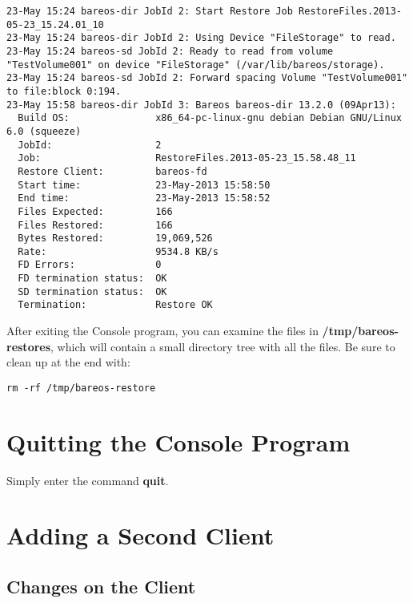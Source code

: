 \footnotesize
\begin{verbatim}
23-May 15:24 bareos-dir JobId 2: Start Restore Job RestoreFiles.2013-05-23_15.24.01_10
23-May 15:24 bareos-dir JobId 2: Using Device "FileStorage" to read.
23-May 15:24 bareos-sd JobId 2: Ready to read from volume "TestVolume001" on device "FileStorage" (/var/lib/bareos/storage).
23-May 15:24 bareos-sd JobId 2: Forward spacing Volume "TestVolume001" to file:block 0:194.
23-May 15:58 bareos-dir JobId 3: Bareos bareos-dir 13.2.0 (09Apr13):
  Build OS:               x86_64-pc-linux-gnu debian Debian GNU/Linux 6.0 (squeeze)
  JobId:                  2
  Job:                    RestoreFiles.2013-05-23_15.58.48_11
  Restore Client:         bareos-fd
  Start time:             23-May-2013 15:58:50
  End time:               23-May-2013 15:58:52
  Files Expected:         166
  Files Restored:         166
  Bytes Restored:         19,069,526
  Rate:                   9534.8 KB/s
  FD Errors:              0
  FD termination status:  OK
  SD termination status:  OK
  Termination:            Restore OK
\end{verbatim}
\normalsize

After exiting the Console program, you can examine the files in {\bf
/tmp/bareos-restores}, which will contain a small directory tree with all the
files. Be sure to clean up at the end with:

\footnotesize
\begin{verbatim}
rm -rf /tmp/bareos-restore
\end{verbatim}
\normalsize

\section{Quitting the Console Program}

Simply enter the command {\bf quit}.
\label{SecondClient}

\section{Adding a Second Client}

\subsection{Changes on the Client}

